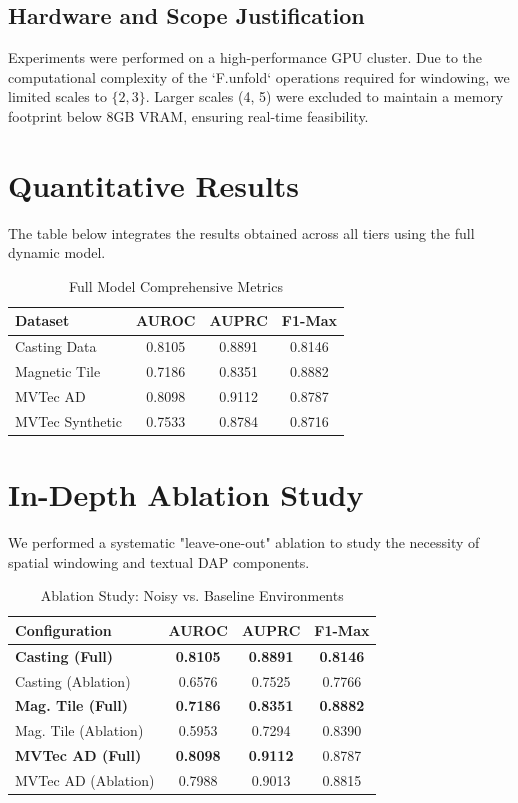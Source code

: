 \documentclass[10pt,twocolumn]{article}
\begin{document}
\subsection{Hardware and Scope Justification}
Experiments were performed on a high-performance GPU cluster. Due to the computational complexity of the `F.unfold` operations required for windowing, we limited scales to $\{2, 3\}$. Larger scales (4, 5) were excluded to maintain a memory footprint below 8GB VRAM, ensuring real-time feasibility.

\section{Quantitative Results}
The table below integrates the results obtained across all tiers using the full dynamic model.

\begin{table}[h]
\centering
\small
\caption{Full Model Comprehensive Metrics}
\begin{tabular}{@{}lccc@{}}
\toprule
\textbf{Dataset} & \textbf{AUROC} & \textbf{AUPRC} & \textbf{F1-Max} \\ \midrule
Casting Data & 0.8105 & 0.8891 & 0.8146 \\
Magnetic Tile & 0.7186 & 0.8351 & 0.8882 \\
MVTec AD & 0.8098 & 0.9112 & 0.8787 \\
MVTec Synthetic & 0.7533 & 0.8784 & 0.8716 \\ \bottomrule
\end{tabular}
\end{table}

\section{In-Depth Ablation Study}
We performed a systematic "leave-one-out" ablation to study the necessity of spatial windowing and textual DAP components.

\begin{table}[h]
\centering
\small
\caption{Ablation Study: Noisy vs. Baseline Environments}
\begin{tabular}{@{}lccc@{}}
\toprule
\textbf{Configuration} & \textbf{AUROC} & \textbf{AUPRC} & \textbf{F1-Max} \\ \midrule
\textbf{Casting (Full)} & \textbf{0.8105} & \textbf{0.8891} & \textbf{0.8146} \\
Casting (Ablation) & 0.6576 & 0.7525 & 0.7766 \\ \midrule
\textbf{Mag. Tile (Full)} & \textbf{0.7186} & \textbf{0.8351} & \textbf{0.8882} \\
Mag. Tile (Ablation) & 0.5953 & 0.7294 & 0.8390 \\ \midrule
\textbf{MVTec AD (Full)} & \textbf{0.8098} & \textbf{0.9112} & 0.8787 \\
MVTec AD (Ablation) & 0.7988 & 0.9013 & 0.8815 \\ \bottomrule
\end{tabular}
\end{table}
\end{document}
